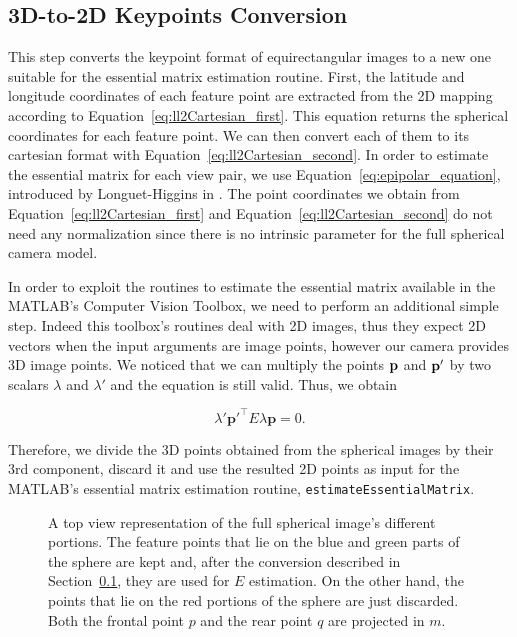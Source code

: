 \subsection{3D-to-2D Keypoints Conversion}
\label{sec:keypoints_conversion}
This step converts the keypoint format of equirectangular images to a new one 
suitable for the essential matrix estimation routine.
First, the latitude and longitude coordinates of each feature point are 
extracted from the 2D mapping according to  
Equation~\ref{eq:ll2Cartesian_first}.
This equation returns the spherical coordinates for each feature point. 
We can then convert each of them to its cartesian format with 
Equation~\ref{eq:ll2Cartesian_second}. In order to estimate the essential 
matrix for each view pair, we use Equation~\ref{eq:epipolar_equation}, 
introduced by Longuet-Higgins in \cite{longuet1981computer}.
The point coordinates we obtain from Equation~\ref{eq:ll2Cartesian_first} and
Equation~\ref{eq:ll2Cartesian_second} do not need any normalization since there
is no intrinsic parameter for the full spherical camera model.

In order to exploit the routines to estimate the essential matrix available 
in the MATLAB's Computer Vision Toolbox, we need to perform an additional simple 
step.
Indeed this toolbox's routines deal with 2D images, thus they expect 
2D vectors when the input arguments are image points, however our camera
provides 3D image points.
We noticed that we can multiply the points $\mathbf{p}$
and $\mathbf{p}'$ by two 
scalars ${\lambda}$ and 
${\lambda}'$ and the equation is still valid. Thus, we obtain

\begin{equation*}
\lambda'\mathbf{p}'^\top E\lambda\mathbf{p} = 0 \text{.}
\end{equation*}

Therefore, we divide the 3D points obtained from the spherical images by their 
3rd component, discard it and use the resulted 2D points as input for the 
MATLAB's essential matrix estimation routine, {\tt estimateEssentialMatrix}.

\begin{figure}
    \centering
    \def\svgwidth{0.8\columnwidth}
    
    \caption{A top view representation of the full spherical image's 
    different portions.
    The feature points that lie on the blue and green parts of the sphere are kept and,
    after the conversion described in Section~\ref{sec:keypoints_conversion},
    they are used for $E$ estimation. On the other hand, the points that lie
    on the red portions of the sphere are just discarded.
    Both the frontal point $p$ and the rear point $q$ are projected in $m$.}
	\label{fig:sphere_division}
\end{figure}

